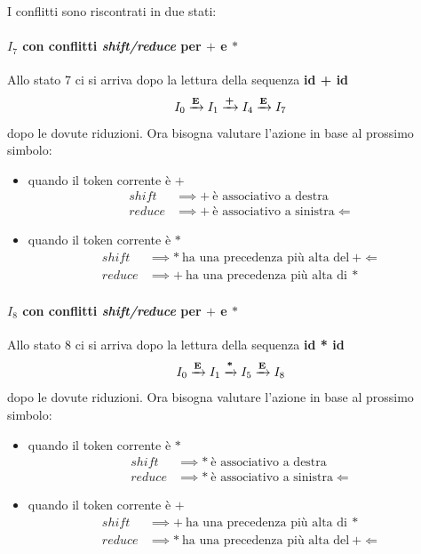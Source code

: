 I conflitti sono riscontrati in due stati:
\paragraph{$I_7$ con conflitti \textit{shift/reduce} per $+$ e $*$}
Allo stato 7 ci si arriva dopo la lettura della sequenza \textbf{id + id}
$$I_0 \xrightarrow{\text{\textbf{E}}} I_1 \xrightarrow{\text{\textbf{+}}}
I_4 \xrightarrow{\text{\textbf{E}}} I_7$$
dopo le dovute riduzioni. Ora bisogna valutare l'azione in base al prossimo
simbolo:
\begin{itemize}
\item quando il token corrente \`e $+$
\begin{align*}
shift   &\implies + \ \text{\`e associativo a destra}   \\
reduce &\implies + \ \text{\`e associativo a sinistra} \Leftarrow
\end{align*}
\item quando il token corrente \`e $*$
\begin{align*}
shift   &\implies * \ \text{ha una precedenza pi\`u alta del} \ + \Leftarrow \\
reduce  &\implies + \ \text{ha una precedenza pi\`u alta di} \ *
\end{align*}
\end{itemize}

\paragraph{$I_8$ con conflitti \textit{shift/reduce} per $+$ e $*$}
Allo stato 8 ci si arriva dopo la lettura della sequenza \textbf{id * id}
$$I_0 \xrightarrow{\text{\textbf{E}}} I_1 \xrightarrow{\text{\textbf{*}}}
I_5 \xrightarrow{\text{\textbf{E}}} I_8$$
dopo le dovute riduzioni. Ora bisogna valutare l'azione in base al prossimo
simbolo:
\begin{itemize}
\item quando il token corrente \`e $*$
\begin{align*}
shift   &\implies * \ \text{\`e associativo a destra}   \\
reduce &\implies * \ \text{\`e associativo a sinistra} \Leftarrow
\end{align*}
\item quando il token corrente \`e $+$
\begin{align*}
shift   &\implies + \ \text{ha una precedenza pi\`u alta di} \  * \\
reduce  &\implies * \ \text{ha una precedenza pi\`u alta del} \ + \Leftarrow
\end{align*}
\end{itemize}

